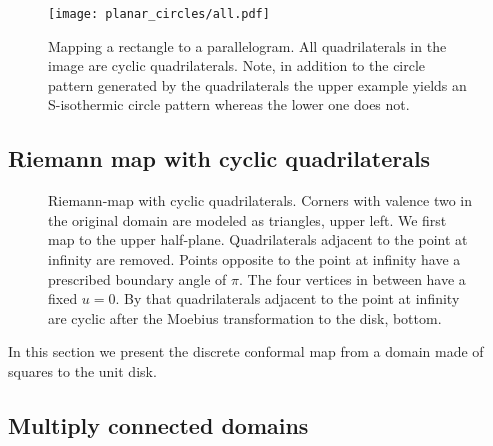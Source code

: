 \documentclass[Thesis.tex]{subfiles}
\begin{document}
  \begin{figure}
  \centering
  \texttt{[image: planar\_circles/all.pdf]}
  \caption{
  Mapping a rectangle to a parallelogram.
  All quadrilaterals in the image are cyclic quadrilaterals.
  Note, in addition to the circle pattern generated by the quadrilaterals the upper example yields an S-isothermic circle pattern whereas the lower one does not.
  }
  \end{figure}

  \subsection{Riemann map with cyclic quadrilaterals}

  \begin{figure}
  \centering
  \caption{
  Riemann-map with cyclic quadrilaterals.
  Corners with valence two in the original domain are modeled as triangles, upper left.
  We first map to the upper half-plane.
  Quadrilaterals adjacent to the point at infinity are removed.
  Points opposite to the point at infinity have a prescribed boundary angle of $\pi$.
  The four vertices in between have a fixed $u=0$.
  By that quadrilaterals adjacent to the point at infinity are cyclic after the Moebius transformation to the disk, bottom.
  }
  \label{fig:circular_riemann}
  \end{figure}

  In this section we present the discrete conformal map from a domain made of squares to the unit disk.


  \subsection{Multiply connected domains}
\end{document}
